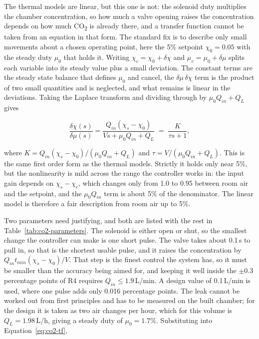 The thermal models are linear, but this one is not: the solenoid duty multiplies the chamber concentration, so how much a valve opening raises the concentration depends on how much CO\textsubscript{2} is already there, and a transfer function cannot be taken from an equation in that form. The standard fix is to describe only small movements about a chosen operating point, here the 5\% setpoint $\chi_0 = 0.05$ with the steady duty $\mu_0$ that holds it. Writing $\chi_c = \chi_0 + \delta\chi$ and $\mu_v = \mu_0 + \delta\mu$ splits each variable into its steady value plus a small deviation. The constant terms are the steady state balance that defines $\mu_0$ and cancel, the $\delta\mu\,\delta\chi$ term is the product of two small quantities and is neglected, and what remains is linear in the deviations. Taking the Laplace transform and dividing through by $\mu_0 Q_{in} + Q_L$ gives

\begin{equation}
\frac{\delta\chi(s)}{\delta\mu(s)}
= \frac{Q_{in}(\chi_s - \chi_0)}{Vs + \mu_0 Q_{in} + Q_L}
\;=\; \frac{K}{\tau s + 1},
\label{eq:co2-tf}
\end{equation}

where $K = Q_{in}(\chi_s-\chi_0)/(\mu_0 Q_{in} + Q_L)$ and $\tau = V/(\mu_0 Q_{in} + Q_L)$. This is the same first order form as the thermal models. Strictly it holds only near 5\%, but the nonlinearity is mild across the range the controller works in: the input gain depends on $\chi_s - \chi_c$, which changes only from 1.0 to 0.95 between room air and the setpoint, and the $\mu_0 Q_{in}$ term is about 5\% of the denominator. The linear model is therefore a fair description from room air up to 5\%.

Two parameters need justifying, and both are listed with the rest in Table~\ref{tab:co2-parameters}. The solenoid is either open or shut, so the smallest change the controller can make is one short pulse. The valve takes about 0.1\,s to pull in, so that is the shortest usable pulse, and it raises the concentration by $Q_{in} t_{min} (\chi_s-\chi_0)/V$. That step is the finest control the system has, so it must be smaller than the accuracy being aimed for, and keeping it well inside the $\pm$0.3 percentage points of R4 requires $Q_{in} \leq 1.9$\,L/min. A design value of 0.1\,L/min is used, where one pulse adds only 0.016 percentage points. The leak cannot be worked out from first principles and has to be measured on the built chamber; for the design it is taken as two air changes per hour, which for this volume is $Q_L = 1.98$\,L/h, giving a steady duty of $\mu_0 = 1.7\%$. Substituting into Equation~\ref{eq:co2-tf},

